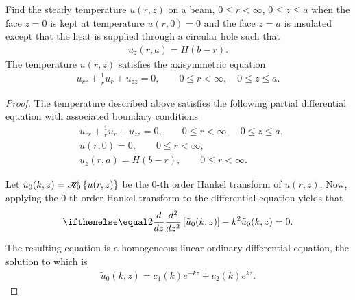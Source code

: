 \begin{problem}{7.14}
  Find the steady temperature $u(r, z)$ on a beam, $0 \leq r < \infty$, $0 \leq z \leq a$
  when the face $z=0$ is kept at temperature $u(r, 0) = 0$ and the face $z=a$
  is insulated except that the heat is supplied through a circular hole such that
  \begin{align*}
    u_z(r, a) = H(b-r).
  \end{align*}
  The temperature $u(r, z)$ satisfies the axisymmetric equation
  \begin{align*}
    u_{rr} + \frac{1}{r}u_r + u_{zz} = 0, \qquad 0 \leq r < \infty, \quad 0 \leq z \leq a.
  \end{align*}
\end{problem}

\begin{proof}
  The temperature described above satisfies the following partial differential equation
  with associated boundary conditions
  \begin{align*}
    &u_{rr} + \frac{1}{r}u_r + u_{zz} = 0, \qquad 0 \leq r < \infty, \quad 0 \leq z \leq a, \\
    &u(r, 0) = 0, \qquad 0 \leq r < \infty, \\
    &u_z(r, a) = H(b-r), \qquad 0 \leq r < \infty.
  \end{align*}

  Let $\tilde{u}_0(k, z) = \mathscr{H}_{ {0} }\left\{ {u(r, z)} \right\}$ be the 0-th order Hankel transform of
  $u(r, z)$. Now, applying the 0-th order Hankel transform to the differential equation yields that
  \begin{align*}
    \der{z}{2}\left[ \tilde{u}_0(k, z)\right] -k^2 \tilde{u}_0(k, z) = 0.
  \end{align*}

  The resulting equation is a homogeneous linear ordinary differential equation, the
  solution to which is
  \begin{align}\label{homo-7-14}
    \tilde{u}_0(k, z) = c_1(k) e^{-kz} + c_2(k) e^{kz}.
  \end{align}


\end{proof}
